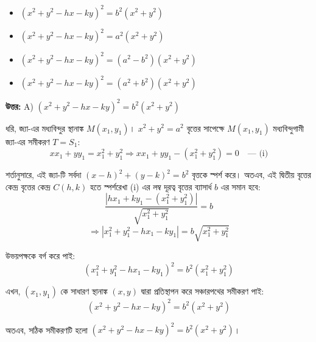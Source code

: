 \documentclass[12pt, a4paper]{article}
\begin{document}
\begin{itemize}[label={}, leftmargin=1cm, itemsep=0.5em]
    \item[\textbf{A)}] $(x^2 + y^2 - hx - ky)^2 = b^2(x^2 + y^2)$
    \item[\textbf{B)}] $(x^2 + y^2 - hx - ky)^2 = a^2(x^2 + y^2)$
    \item[\textbf{C)}] $(x^2 + y^2 - hx - ky)^2 = (a^2 - b^2)(x^2 + y^2)$
    \item[\textbf{D)}] $(x^2 + y^2 - hx - ky)^2 = (a^2 + b^2)(x^2 + y^2)$
\end{itemize}

\vspace{0.5em}
\begin{tcolorbox}[answerbox]
    \textbf{\color{success} উত্তর:} A) $(x^2 + y^2 - hx - ky)^2 = b^2(x^2 + y^2)$
\end{tcolorbox}
\vspace{1em}

\begin{tcolorbox}[solutionbox={সমাধান (Solution)}]
    \noindent
    ধরি, জ্যা-এর মধ্যবিন্দুর স্থানাঙ্ক $M(x_1, y_1)$। $x^2 + y^2 = a^2$ বৃত্তের সাপেক্ষে $M(x_1, y_1)$ মধ্যবিন্দুগামী জ্যা-এর সমীকরণ $T = S_1$:
    \[ xx_1 + yy_1 = x_1^2 + y_1^2 \Rightarrow xx_1 + yy_1 - (x_1^2 + y_1^2) = 0 \quad \text{--- (i)} \]
    
    \vspace{0.5em}
    শর্তানুসারে, এই জ্যা-টি সর্বদা $(x - h)^2 + (y - k)^2 = b^2$ বৃত্তকে স্পর্শ করে। অতএব, এই দ্বিতীয় বৃত্তের কেন্দ্র বৃত্তের কেন্দ্র $C(h, k)$ হতে স্পর্শরেখা (i) এর লম্ব দূরত্ব বৃত্তের ব্যাসার্ধ $b$ এর সমান হবে:
    \[ \frac{|hx_1 + ky_1 - (x_1^2 + y_1^2)|}{\sqrt{x_1^2 + y_1^2}} = b \]
    \[ \Rightarrow |x_1^2 + y_1^2 - hx_1 - ky_1| = b\sqrt{x_1^2 + y_1^2} \]
    
    \vspace{0.5em}
    উভয়পক্ষকে বর্গ করে পাই:
    \[ (x_1^2 + y_1^2 - hx_1 - ky_1)^2 = b^2(x_1^2 + y_1^2) \]
    
    \vspace{0.5em}
    এখন, $(x_1, y_1)$ কে সাধারণ স্থানাঙ্ক $(x, y)$ দ্বারা প্রতিস্থাপন করে সঞ্চারপথের সমীকরণ পাই:
    \[ (x^2 + y^2 - hx - ky)^2 = b^2(x^2 + y^2) \]
    
    \vspace{0.5em}
    অতএব, সঠিক সমীকরণটি হলো $(x^2 + y^2 - hx - ky)^2 = b^2(x^2 + y^2)$।
\end{tcolorbox}
\end{document}
